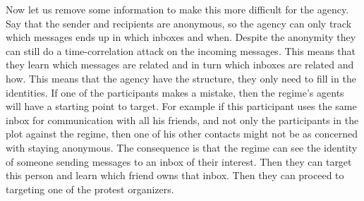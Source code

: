 Now let us remove some information to make this more difficult for the agency.
Say that the sender and recipients are anonymous, so the agency can only track 
which messages ends up in which inboxes and when.
Despite the anonymity they can still do a time-correlation attack on the 
incoming messages.
This means that they learn which messages are related and in turn which inboxes 
are related and how.
This means that the agency have the structure, they only need to fill in the 
identities.
If one of the participants makes a mistake, then the regime's agents will have 
a starting point to target.
For example if this participant uses the same inbox for communication with all 
his friends, and not only the participants in the plot against the regime, then 
one of his other contacts might not be as concerned with staying anonymous.
The consequence is that the regime can see the identity of someone sending 
messages to an inbox of their interest.
Then they can target this person and learn which friend owns that inbox.
Then they can proceed to targeting one of the protest organizers.
